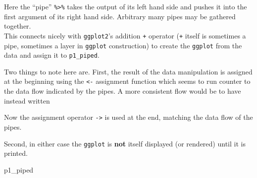 \documentclass[]{article}
\newenvironment{Shaded}{\begin{snugshade}}{\end{snugshade}}
\newcommand{\KeywordTok}[1]{\textcolor[rgb]{0.13,0.29,0.53}{\textbf{#1}}}
\newcommand{\DataTypeTok}[1]{\textcolor[rgb]{0.13,0.29,0.53}{#1}}
\newcommand{\DecValTok}[1]{\textcolor[rgb]{0.00,0.00,0.81}{#1}}
\newcommand{\FloatTok}[1]{\textcolor[rgb]{0.00,0.00,0.81}{#1}}
\newcommand{\StringTok}[1]{\textcolor[rgb]{0.31,0.60,0.02}{#1}}
\newcommand{\CommentTok}[1]{\textcolor[rgb]{0.56,0.35,0.01}{\textit{#1}}}
\newcommand{\OperatorTok}[1]{\textcolor[rgb]{0.81,0.36,0.00}{\textbf{#1}}}
\newcommand{\NormalTok}[1]{#1}
\begin{document}
Here the ``pipe'' \texttt{\%\textgreater{}\%} takes the output of its
left hand side and pushes it into the first argument of its right hand
side. Arbitrary many pipes may be gathered together.\\
This connects nicely with \texttt{ggplot2}'s addition \texttt{+}
operator (\texttt{+} itself is sometimes a pipe, sometimes a layer in
\texttt{ggplot} construction) to create the \texttt{ggplot} from the
data and assign it to \texttt{p1\_piped}.

Two things to note here are. First, the result of the data manipulation
is assigned at the beginning using the \texttt{\textless{}-} assignment
function which seems to run counter to the data flow indicated by the
pipes. A more consistent flow would be to have instead written

\begin{Shaded}
\end{Shaded}

Now the assignment operator \texttt{-\textgreater{}} is used at the end,
matching the data flow of the pipes.

Second, in either case the \texttt{ggplot} is \textbf{not} itself
displayed (or rendered) until it is printed.

\begin{Shaded}
\begin{Highlighting}[]
\NormalTok{p1_piped}
\end{Highlighting}
\end{Shaded}
\end{document}
